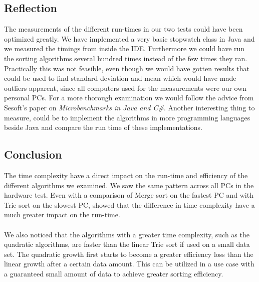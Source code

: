 \vspace{0.5cm}
\subsection{Reflection}
\label{sec:5.3}

The measurements of the different run-times in our two tests could have been optimized greatly. We have implemented a very basic stopwatch class in Java and we measured the timings from inside the IDE. Furthermore we could have run the sorting algorithms several hundred times instead of the few times they ran. 
\\
Practically this was not feasible, even though we would have gotten results that could be used to find standard deviation and mean which would have made outliers apparent, since all computers used for the measurements were our own personal PCs. For a more thorough examination we would follow the advice from Sesoft's paper on \emph{Microbenchmarks in Java and C\#}. \cite{sesoft}
\newline
Another interesting thing to measure, could be to implement the  algorithms in more programming languages beside Java and compare the run time of these implementations.  


\vspace{0.5cm}
\subsection{Conclusion}
\label{sec:5.4}
The time complexity have a direct impact on the run-time and efficiency of the different algorithms we examined. We saw the same pattern across all PCs in the hardware test. Even with a comparison of Merge sort on the fastest PC and with Trie sort on the slowest PC, showed that the difference in time complexity have a much greater impact on the run-time. 
\\
\\
We also noticed that the algorithms with a greater time complexity, such as the quadratic algorithms, are faster than the linear Trie sort if used on a small data set. The quadratic growth first starts to become a greater efficiency loss than the linear growth after a certain data amount. This can be utilized in a use case with a guaranteed small amount of data to achieve greater sorting efficiency.  